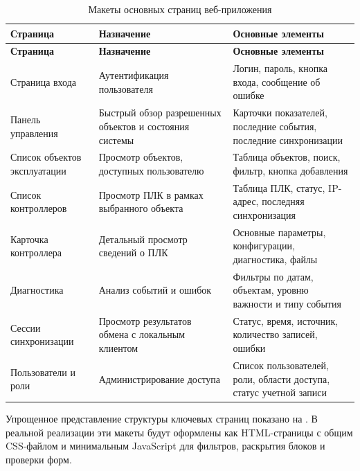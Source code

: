 \small
\begin{longtable}{|p{}|p{}|p{}|}
    \caption{Макеты основных страниц веб-приложения} \label{tab:page_mockups} \\
    \hline
    \textbf{Страница} & \textbf{Назначение} & \textbf{Основные элементы} \\ \hline
    \endfirsthead

    \tabcont{\ref{tab:page_mockups}}
    \textbf{Страница} & \textbf{Назначение} & \textbf{Основные элементы} \\ \hline
    \endhead

    \hline
    \endfoot

    \hline
    \endlastfoot

    Страница входа & Аутентификация пользователя & Логин, пароль, кнопка входа, сообщение об ошибке \\ \hline
    Панель управления & Быстрый обзор разрешенных объектов и состояния системы & Карточки показателей, последние события, последние синхронизации \\ \hline
    Список объектов эксплуатации & Просмотр объектов, доступных пользователю & Таблица объектов, поиск, фильтр, кнопка добавления \\ \hline
    Список контроллеров & Просмотр ПЛК в рамках выбранного объекта & Таблица ПЛК, статус, IP-адрес, последняя синхронизация \\ \hline
    Карточка контроллера & Детальный просмотр сведений о ПЛК & Основные параметры, конфигурации, диагностика, файлы \\ \hline
    Диагностика & Анализ событий и ошибок & Фильтры по датам, объектам, уровню важности и типу события \\ \hline
    Сессии синхронизации & Просмотр результатов обмена с локальным клиентом & Статус, время, источник, количество записей, ошибки \\ \hline
    Пользователи и роли & Администрирование доступа & Список пользователей, роли, области доступа, статус учетной записи \\ \hline
\end{longtable}
\normalsize

Упрощенное представление структуры ключевых страниц показано на
. В реальной реализации эти макеты будут оформлены как
HTML-страницы с общим CSS-файлом и минимальным JavaScript для фильтров,
раскрытия блоков и проверки форм.


